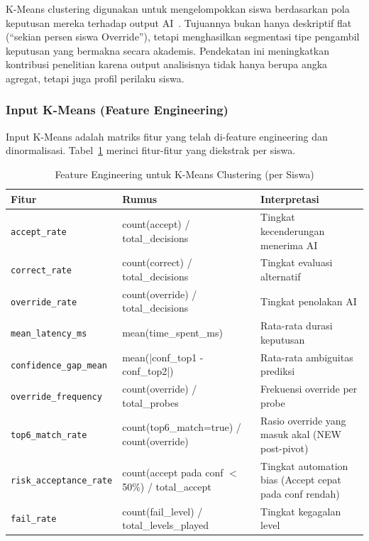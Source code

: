 \documentclass[12pt,a4paper,oneside,openany]{report}
\begin{document}
K-Means clustering digunakan untuk mengelompokkan siswa berdasarkan pola keputusan mereka terhadap output AI~\cite{ref10}\cite{ref11}. Tujuannya bukan hanya deskriptif flat (``sekian persen siswa Override''), tetapi menghasilkan segmentasi tipe pengambil keputusan yang bermakna secara akademis. Pendekatan ini meningkatkan kontribusi penelitian karena output analisisnya tidak hanya berupa angka agregat, tetapi juga profil perilaku siswa.

\subsubsection{Input K-Means (Feature Engineering)}

Input K-Means adalah matriks fitur yang telah di-feature engineering dan dinormalisasi. Tabel~\ref{tab:kmeans-feature} merinci fitur-fitur yang diekstrak per siswa.

\begin{table}[H]
\centering
\caption{Feature Engineering untuk K-Means Clustering (per Siswa)}
\label{tab:kmeans-feature}
\begin{tabular}{|p{3.5cm}|p{4cm}|p{5cm}|}
\hline
\textbf{Fitur} & \textbf{Rumus} & \textbf{Interpretasi} \\ \hline
\texttt{accept\_rate} & count(accept) / total\_decisions & Tingkat kecenderungan menerima AI \\ \hline
\texttt{correct\_rate} & count(correct) / total\_decisions & Tingkat evaluasi alternatif \\ \hline
\texttt{override\_rate} & count(override) / total\_decisions & Tingkat penolakan AI \\ \hline
\texttt{mean\_latency\_ms} & mean(time\_spent\_ms) & Rata-rata durasi keputusan \\ \hline
\texttt{confidence\_gap\_mean} & mean(|conf\_top1 - conf\_top2|) & Rata-rata ambiguitas prediksi \\ \hline
\texttt{override\_frequency} & count(override) / total\_probes & Frekuensi override per probe \\ \hline
\texttt{top6\_match\_rate} & count(top6\_match=true) / count(override) & Rasio override yang masuk akal (NEW post-pivot) \\ \hline
\texttt{risk\_acceptance\_rate} & count(accept pada conf $<$ 50\%) / total\_accept & Tingkat automation bias (Accept cepat pada conf rendah) \\ \hline
\texttt{fail\_rate} & count(fail\_level) / total\_levels\_played & Tingkat kegagalan level \\ \hline
\end{tabular}
\end{table}
\end{document}
